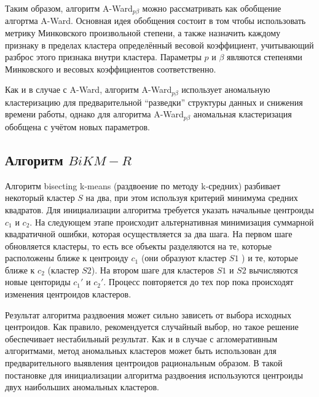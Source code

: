 \documentclass[12pt]{instruction}
\begin{document}
Таким образом, алгоритм  A-Ward$_{p\beta} $ можно рассматривать как обобщение алгортма A-Ward. Основная идея обобщения состоит в том чтобы использовать метрику Минковского произвольной степени, а также назначить каждому признаку в пределах кластера определённый весовой коэффициент, учитывающий разброс этого признака внутри кластера. Параметры $ p $ и $ \beta $ являются степенями Минковского и весовых коэффициентов соответственно.

 Как и в случае с A-Ward, алгоритм A-Ward$_{p\beta} $ использует аномальную кластеризацию для предварительной ``разведки'' структуры данных и снижения времени работы, однако для алгоритма A-Ward$_{p\beta} $ аномальная кластеризация обобщена с учётом новых параметров.
 

\subsection{Алгоритм $ BiKM-R $}
	
Алгоритм bisecting k-means (раздвоение по методу k-средних) разбивает некоторый кластер $ S $ на два, при этом используя критерий минимума средних квадратов. Для инициализации алгоритма требуется указать начальные центроиды $ c_{1} $ и $ c_{2} $. На следующем этапе происходит альтернативная минимизация суммарной квадратичной ошибки, которая осуществляется за два шага. На первом шаге обновляется кластеры, то есть все объекты разделяются на те, которые расположены ближе к центроиду $ c_{1} $ (они образуют кластер $ S1 $ ) и те, которые ближе к $ c_{2} $ (кластер $ S2 $). На втором шаге для кластеров $ S1 $ и $ S2 $ вычисляются новые центориды $ c_{1}' $ и $ c_{2}' $. Процесс повторяется до тех пор пока происходят изменения центроидов кластеров. 

Результат алгоритма раздвоения может сильно зависеть от выбора исходных центроидов. Как правило, рекомендуется случайный выбор, но такое решение обеспечивает нестабильный результат. Как и в случае с агломеративным алгоритмами, метод аномальных кластеров может быть использован для предварительного выявления центроидов рациональным образом.  В такой постановке для инициализации алгоритма раздвоения используются центроиды двух наибольших аномальных кластеров. 
\end{document}
